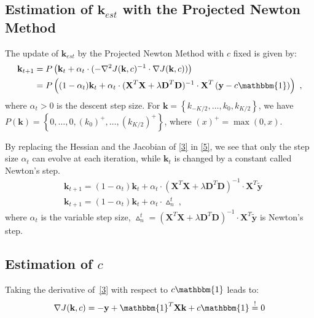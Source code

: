 \documentclass[]{elsarticle} %
\begin{document}
\subsection{Estimation of \texorpdfstring{$\textbf{k}_{est}$}{k \textsubscript{est}} with the Projected Newton Method}

The update of $\textbf{k}_{est}$  by the Projected Newton Method with $c$ fixed is given by:
\begin{align}
\label{5}
\nonumber
\textbf{k}_{t+1} & = P\left( \textbf{k}_{t} + \alpha_{t} \cdot (- \nabla^{2} J(\textbf{k},c) ^{-1} \cdot  \nabla J(\textbf{k},c) ) \right) \\
& = P\left( (1- \alpha_{t}) \textbf{k}_{t} + \alpha_{t} \cdot (\textbf{X}^{T}\textbf{X} + \lambda \textbf{D}^{T}\textbf{D})^{-1} \cdot \textbf{X}^{T}\left(\textbf{y}-c\mathbbm{1}\right)  \right)\ ,
\end{align}
where $\alpha_t>0$ is the descent step size.
For $\textbf{k} = \left\{k_{-K/2},\ldots,k_0,k_{K/2}\right\}$, we have $P(\textbf{k}) = \left\{0,\ldots,0,(k_0)^+,\ldots,(k_{K/2})^+\right\}$, where $(x)^+=\max(0,x)$.

By replacing the Hessian and the Jacobian of \eqref{3} in \eqref{5}, we see that only the step size $\alpha_t$ can evolve at each iteration, while $\textbf{k}_{t}$ is changed by a constant called Newton's step.
\begin{equation}
\begin{aligned}\label{6}
&\textbf{k}_{t+1} = (1- \alpha_{t}) \textbf{k}_{t} + \alpha_{t} \cdot (\textbf{X}^{T}\textbf{X} + \lambda \textbf{D}^{T}\textbf{D})^{-1} \cdot \textbf{X}^{T}\tilde{\textbf{y}}\\
&\textbf{k}_{t+1} = (1- \alpha_{t}) \textbf{k}_{t} + \alpha_{t} \cdot \vartriangle_{n}^{t}\ ,
\end{aligned}
\end{equation}
where $\alpha_{t}$ is the  variable step size,
$ \vartriangle_{n}^{t} = (\textbf{X}^{T}\textbf{X} + \lambda \textbf{D}^{T}\textbf{D})^{-1} \cdot \textbf{X}^{T}\tilde{\textbf{y}}$ is Newton's step.


\subsection{Estimation of \texorpdfstring{$c$}{c}}

Taking the derivative of~\eqref{3} with respect to $c\mathbbm{1}$ leads to:
\begin{equation}\label{7}
\begin{aligned}
&\nabla J(\textbf{k},c) = - \textbf{y} + \mathbbm{1}^{T}\textbf{X} \textbf{k} + c\mathbbm{1} \overset{!}{=} 0\\
\end{aligned}
\end{equation}
\end{document}
